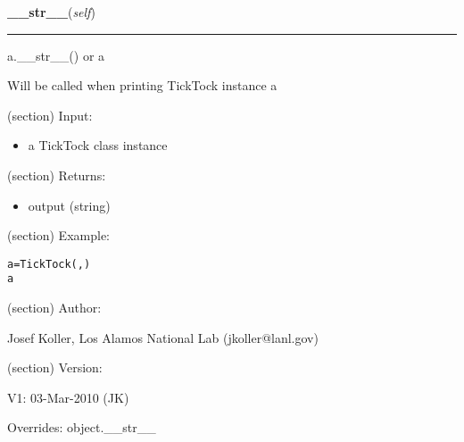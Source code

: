 \hspace{.8\funcindent}\begin{boxedminipage}{\funcwidth}

    \raggedright \textbf{\_\_str\_\_}(\textit{self})

    \vspace{-1.5ex}

    \rule{\textwidth}{0.5\fboxrule}
\setlength{\parskip}{2ex}
    a.\_\_str\_\_() or a

    Will be called when printing TickTock instance a

    (section) Input:

      \begin{itemize}
      \setlength{\parskip}{0.6ex}
        \item a TickTock class instance

      \end{itemize}

    (section) Returns:

      \begin{itemize}
      \setlength{\parskip}{0.6ex}
        \item output (string)

      \end{itemize}

    (section) Example:

\begin{alltt}
\pysrcprompt{{\textgreater}{\textgreater}{\textgreater} }a = TickTock(, )
\pysrcprompt{{\textgreater}{\textgreater}{\textgreater} }a
\end{alltt}
    (section) Author:

      Josef Koller, Los Alamos National Lab (jkoller@lanl.gov)

    (section) Version:

      V1: 03-Mar-2010 (JK)

\setlength{\parskip}{1ex}
      Overrides: object.\_\_str\_\_

    \end{boxedminipage}

    \vspace{0.5ex}

